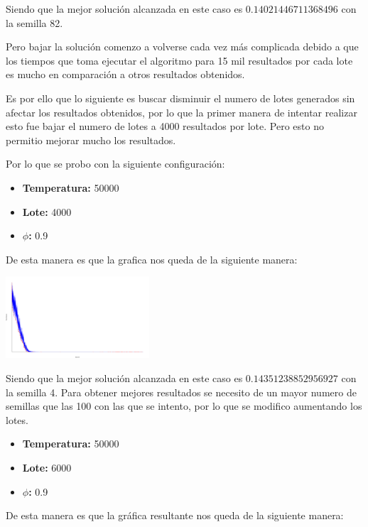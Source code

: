\begin{multicols}{2}
Siendo que la mejor solución alcanzada en este caso es $0.14021446711368496$ con la semilla 82.

Pero bajar la solución comenzo a volverse cada vez más complicada debido a que los tiempos que toma ejecutar el algoritmo para 15 mil resultados por cada lote es mucho en comparación a otros resultados obtenidos.

Es por ello que lo siguiente es buscar disminuir el numero de lotes generados sin afectar los resultados obtenidos, por lo que la primer manera de intentar realizar esto fue bajar el numero de lotes a 4000 resultados por lote. Pero esto no permitio mejorar mucho los resultados.

Por lo que se probo con la siguiente configuración:

\begin{itemize}
\item \textbf{Temperatura:} 50000
\item \textbf{Lote: } 4000
\item \textbf{$\phi$: } 0.9
\end{itemize}

De esta manera es que la grafica nos queda de la siguiente manera:

\begin{center}
    \includegraphics[width=0.4\textwidth]{../svgs/150_documentable_semilla_4.pdf}
\end{center}

Siendo que la mejor solución alcanzada en este caso es $0.14351238852956927$ con la semilla 4. Para obtener mejores resultados se necesito de un mayor numero de semillas que las 100 con las que se intento, por lo que se modifico aumentando los lotes.

\begin{itemize}
\item \textbf{Temperatura:} 50000
\item \textbf{Lote: } 6000
\item \textbf{$\phi$: } 0.9
\end{itemize}

De esta manera es que la gráfica resultante nos queda de la siguiente manera:


\end{multicols}
